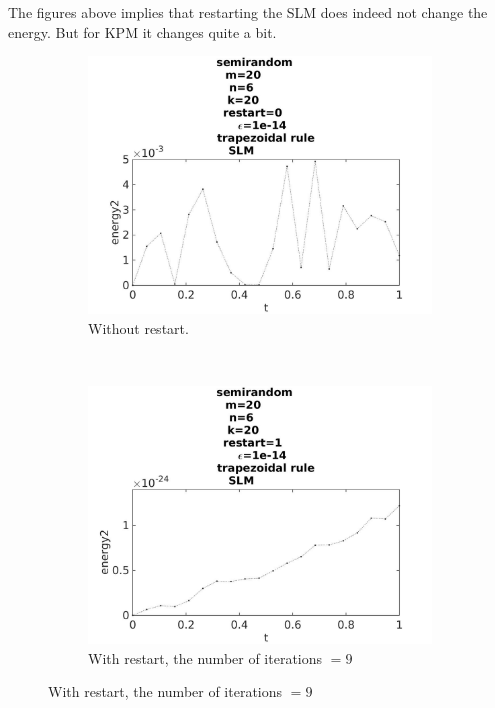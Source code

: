 The figures above implies that restarting the SLM does indeed not change the energy. But for KPM it changes quite a bit. 

\begin{figure}[H]
        \centering
        \begin{subfigure}[b]{0.45\textwidth}
                \includegraphics[width=\textwidth]{../MATLAB/fig/energytestrestart02.jpg}
                \caption{ Without restart. }
                \label{fig:energytestrestart02}
        \end{subfigure}
        ~
        \begin{subfigure}[b]{0.45\textwidth}
                \includegraphics[width=\textwidth]{../MATLAB/fig/energytestrestart12.jpg}
                \caption{ With restart, the number of iterations $= 9$ }
                \label{fig:energytestrestart12}
        \end{subfigure}
        

\end{figure}
